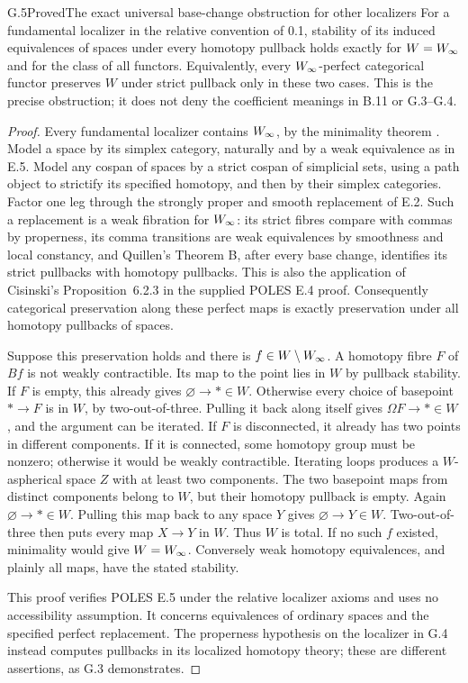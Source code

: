 \begin{statement}{G.5}{Proved}{The exact universal base-change obstruction for other localizers}
For a fundamental localizer in the relative convention of 0.1, stability
of its induced equivalences of spaces under every homotopy pullback
holds exactly for $W=W_{\infty}$ and for the class of all functors. Equivalently,
every $W_{\infty}$-perfect categorical functor preserves $W$ under strict
pullback only in these two cases. This is the precise obstruction; it
does not deny the coefficient meanings in B.11 or G.3--G.4.
\end{statement}
\begin{proof}
Every fundamental localizer contains $W_{\infty}$, by the minimality theorem
\citep[Theorem 6.1.18]{E_Cisinski2006}. Model a space by its simplex
category, naturally and by a weak equivalence as in E.5. Model any
cospan of spaces by a strict cospan of simplicial sets, using a path
object to strictify its specified homotopy, and then by their simplex
categories. Factor one leg through the strongly proper and smooth
replacement of E.2. Such a replacement is a weak fibration for $W_{\infty}$:
its strict fibres compare with commas by properness, its comma
transitions are weak equivalences by smoothness and local constancy,
and Quillen's Theorem B, after every base change, identifies its strict
pullbacks with homotopy pullbacks. This is also the application of
Cisinski's Proposition~6.2.3 in the supplied POLES E.4 proof.
Consequently categorical preservation along these perfect maps is
exactly preservation under all homotopy pullbacks of spaces.

Suppose this preservation holds and there is $f\in W\setminus W_{\infty}$.
A homotopy fibre $F$ of $Bf$ is not weakly contractible. Its map to the
point lies in $W$ by pullback stability. If $F$ is empty, this already
gives $\varnothing\to *\in W$. Otherwise every choice of basepoint
$*\to F$ is in $W$, by two-out-of-three. Pulling it back along itself
gives $\Omega F\to *\in W$, and the argument can be iterated. If $F$
is disconnected, it already has two points in different components.
If it is connected, some homotopy group must be nonzero; otherwise it
would be weakly contractible. Iterating loops produces a $W$-aspherical
space $Z$ with at least two components. The two basepoint maps from
distinct components belong to $W$, but their homotopy pullback is empty.
Again $\varnothing\to *\in W$. Pulling this map back to any space $Y$
gives $\varnothing\to Y\in W$. Two-out-of-three then puts every map
$X\to Y$ in $W$. Thus $W$ is total. If no such $f$ existed, minimality
would give $W=W_{\infty}$. Conversely weak homotopy equivalences, and plainly
all maps, have the stated stability.

This proof verifies POLES E.5 under the relative localizer axioms and
uses no accessibility assumption. It concerns equivalences of ordinary
spaces and the specified perfect replacement. The properness hypothesis
on the localizer in G.4 instead computes pullbacks in its localized
homotopy theory; these are different assertions, as G.3 demonstrates.
\end{proof}

